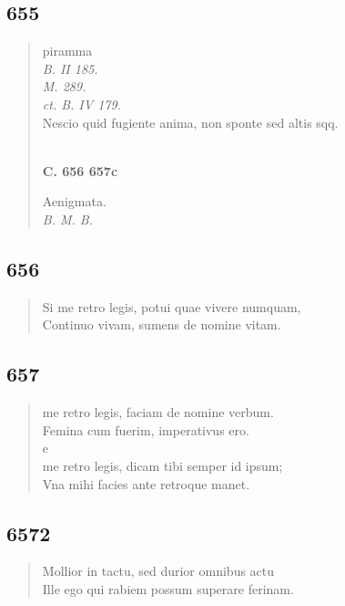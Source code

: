 \documentclass[11pt, a4paper]{report}
\begin{document}
            \subsection*{655}
      \begin{verse}
      piramma \\ \textit{B. II 185.} \\ \textit{M. 289.} \\ \textit{ct. B. IV 179.} \\ Nescio quid fugiente anima, non sponte sed altis sqq. \\ 
        ﻿\pagebreak 
    \begin{center} \textbf{C. 656 657c} \end{center} \marginpar{[129]} Aenigmata. \\ \textit{B. M. B.} \\ 
      \end{verse}
  
            \subsection*{656}
      \begin{verse}
      Si me retro legis, potui quae vivere numquam, \\ Continuo vivam, sumens de nomine vitam. \\ 
      \end{verse}
  
            \subsection*{657}
      \begin{verse}
      me retro legis, faciam de nomine verbum. \\ Femina cum fuerim, imperativus ero. \\ e \\ me retro legis, dicam tibi semper id ipsum; \\ Vna mihi facies ante retroque manet. \\ 
      \end{verse}
  
            \subsection*{6572}
      \begin{verse}
      Mollior in tactu, sed durior omnibus actu \\ Ille ego qui rabiem possum superare ferinam. \\ 
      \end{verse}
  
\end{document}

